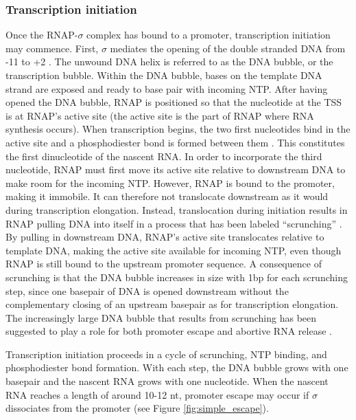 \subsubsection{Transcription initiation}
Once the RNAP-$\sigma$ complex has bound to a promoter, transcription
initiation may commence. First, $\sigma$ mediates the opening of the double
stranded DNA from -11 to +2 \cite{borukhov_rna_2008}. The unwound DNA helix is
referred to as the DNA bubble, or the transcription bubble. Within the DNA
bubble, bases on the template DNA strand are exposed and ready to base pair
with incoming NTP. After having opened the DNA bubble, RNAP is positioned so that the
nucleotide at the TSS is at RNAP's active site (the active site is the part of
RNAP where RNA synthesis occurs). When transcription begins, the two first
nucleotides bind in the active site and a phosphodiester bond is formed between
them \cite{mcclure_steady_1978}. This constitutes the first dinucleotide of
the nascent RNA. In order to incorporate the third nucleotide, RNAP must first
move its active site relative to downstream DNA to make room for the incoming
NTP. However, RNAP is bound to the promoter, making it immobile. It can
therefore not translocate downstream as it would during transcription
elongation. Instead, translocation during initiation results in RNAP pulling
DNA into itself in a process that has been labeled ``scrunching''
\cite{kapanidis_initial_2006, revyakin_abortive_2006}.  By pulling in
downstream DNA, RNAP's active site translocates relative to template DNA,
making the active site available for incoming NTP, even though RNAP is still
bound to the upstream promoter sequence. A consequence of scrunching is that
the DNA bubble increases in size with 1bp for each scrunching step, since one
basepair of DNA is opened downstream without the complementary closing of an
upstream basepair as for transcription elongation. The increasingly large DNA
bubble that results from scrunching has been suggested to play a role for both
promoter escape and abortive RNA release \cite{hsu_promoter_2002,
kapanidis_initial_2006}.

Transcription initiation proceeds in a cycle of scrunching, NTP binding, and
phosphodiester bond formation. With each step, the DNA bubble grows with one
basepair and the nascent RNA grows with one nucleotide. When the nascent RNA
reaches a length of around 10-12 nt, promoter escape may occur if $\sigma$
dissociates from the promoter \cite{hsu_promoter_2002} (see
Figure \ref{fig:simple_escape}).

